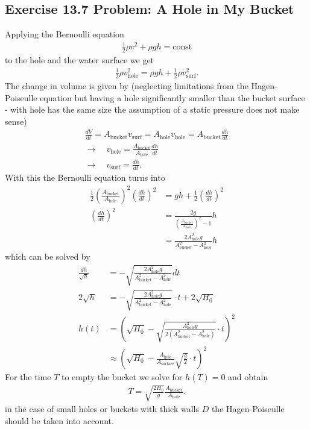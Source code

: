 \documentclass[10pt,a4paper]{book}
\theoremstyle{definition}
\begin{document}
\subsection{Exercise 13.7 Problem: A Hole in My Bucket}
Applying the Bernoulli equation 
\begin{align}
    \frac{1}{2}\rho v^2 + \rho g h = \text{const}
\end{align}
to the hole and the water surface we get
\begin{align}
    \frac{1}{2}\rho v_\text{hole}^2 = \rho g h + \frac{1}{2}\rho v_\text{surf}^2.
\end{align}
The change in volume is given by (neglecting limitations from the Hagen-Poiseulle equation but having a hole significantly smaller than the bucket surface - with hole has the same size the assumption of a static pressure does not make sense)
\begin{align}
    \frac{dV}{dt}=A_\text{bucket}v_\text{surf}=A_\text{hole}v_\text{hole}=A_\text{bucket}\frac{dh}{dt}\\
    \rightarrow\quad v_\text{hole}=\frac{A_\text{bucket}}{A_\text{hole}}\frac{dh}{dt}\\
    \rightarrow\quad v_\text{surf}=\frac{dh}{dt}.
\end{align}
With this the Bernoulli equation turns into
\begin{align}
    \frac{1}{2}\left(\frac{A_\text{bucket}}{A_\text{hole}}\right)^2\left(\frac{dh}{dt}\right)^2&=gh+\frac{1}{2}\left(\frac{dh}{dt}\right)^2\\
    \left(\frac{dh}{dt}\right)^2&=\frac{2g}{\left(\frac{A_\text{bucket}}{A_\text{hole}}\right)^2-1}h\\
    &=\frac{2A_\text{hole}^2g}{A_\text{bucket}^2-A_\text{hole}^2}h
\end{align}
which can be solved by
\begin{align}
    \frac{dh}{\sqrt{h}}&=-\sqrt{\frac{2A_\text{hole}^2g}{A_\text{bucket}^2-A_\text{hole}^2}}dt\\
    2\sqrt{h}&=-\sqrt{\frac{2A_\text{hole}^2g}{A_\text{bucket}^2-A_\text{hole}^2}}\cdot t+2\sqrt{H_0}\\
    h(t)&=\left(\sqrt{H_0}-\sqrt{\frac{A_\text{hole}^2g}{2(A_\text{bucket}^2-A_\text{hole}^2)}}\cdot t\right)^2\\
    &\approx\left(\sqrt{H_0}-\frac{A_\text{hole}}{A_\text{surface}}\sqrt{\frac{g}{2}}\cdot t\right)^2
\end{align}
For the time $T$ to empty the bucket we solve for $h(T)=0$ and obtain
\begin{align}
    T = \sqrt{\frac{2H_0}{g}}\frac{A_\text{bucket}}{A_\text{hole}}.
\end{align}
in the case of small holes or buckets with thick walls $D$ the Hagen-Poiseulle should be taken into account.
\end{document}
